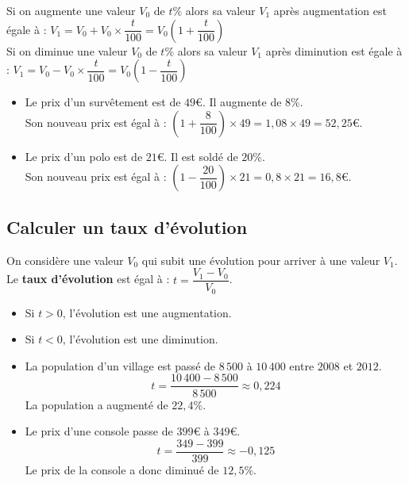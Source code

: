 \begin{Remarque}
Si on augmente une valeur $V_0$ de $t\%$ alors sa valeur $V_1$ après augmentation est égale à : $V_1=V_0+V_0\times \dfrac{t}{100}=V_0\left(1+\dfrac{t}{100}\right)$\\
Si on diminue une valeur $V_0$ de $t\%$ alors sa valeur $V_1$ après diminution est égale à : $V_1=V_0-V_0\times \dfrac{t}{100}=V_0\left(1-\dfrac{t}{100}\right)$
\end{Remarque}

\begin{Exemples}
\leavevmode\vspace{-\baselineskip}
\begin{itemize}
\item Le prix d'un survêtement est de $49$€. Il augmente de $8\%$. \\
Son nouveau prix est égal à : $\left(1+\dfrac{8}{100}\right)\times 49=1,08\times 49= 52,25$€.
\item Le prix d'un polo est de $21$€. Il est soldé de $20\%$. \\
Son nouveau prix est égal à : $\left(1-\dfrac{20}{100}\right)\times 21=0,8\times 21= 16,8$€.
\end{itemize}
\end{Exemples}

\subsection{Calculer un taux d'évolution}

\begin{Définition}
On considère une valeur $V_0$ qui subit une évolution pour arriver à une valeur $V_1$.\\
Le {\bf{taux d'évolution}} est égal à : $t=\dfrac{V_1-V_0}{V_0}$.
\end{Définition}

\begin{Remarque}
\leavevmode\vspace{-\baselineskip}
\begin{itemize}
\item Si $t>0$, l'évolution est une augmentation.
\item Si $t<0$, l'évolution est une diminution.
\end{itemize}
\end{Remarque}

\begin{Exemples}
\leavevmode\vspace{-\baselineskip}
\begin{itemize}
\item La population d'un village est passé de $8\,500$ à $10\,400$ entre $2008$ et $2012$.
$$t=\dfrac{10\,400-8\,500}{8\,500}\approx 0,224$$
La population a augmenté de $22,4\%$.

\item Le prix d'une console passe de $399$€ à  $349$€. 
$$t=\dfrac{349-399}{399}\approx -0,125$$
Le prix de la console a donc diminué de $12,5\%$.
\end{itemize}
\end{Exemples}


